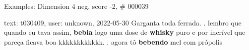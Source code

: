 \begin{frame}{Examples: Dimension 4 neg, score -2, \# 000039}
\footnotesize
\begin{alertblock}{text: t030409, user: unknown, 2022-05-30}
Garganta toda ferrada. . lembro que quando eu tava assim, \textbf{bebia} logo 
uma dose de \textbf{whisky} puro e por incrível que pareça ficava boa 
kkkkkkkkkkkk. . agora tô \textbf{bebendo} mel com própolis 
 🥹  
\end{alertblock}
\end{frame}
